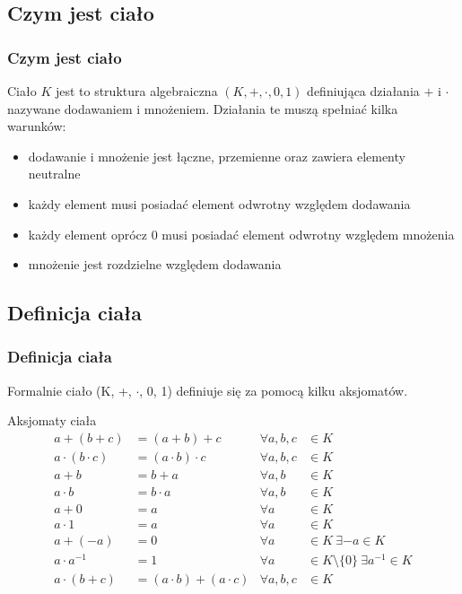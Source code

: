 \documentclass{beamer}
\begin{document}

\subsection{Czym jest ciało}

\begin{frame}
	\frametitle{Czym jest ciało}

	Ciało $K$ jest to struktura algebraiczna $(K, +, \cdot, 0, 1)$ definiująca
	działania $+$ i $\cdot$ nazywane dodawaniem i mnożeniem.
	Działania te muszą spełniać kilka warunków:
	\begin{itemize}
		\item dodawanie i mnożenie jest łączne, przemienne oraz zawiera elementy neutralne
		\item każdy element musi posiadać element odwrotny względem dodawania
		\item każdy element oprócz $0$ musi posiadać element odwrotny względem mnożenia
		\item mnożenie jest rozdzielne względem dodawania
	\end{itemize}

\end{frame}

\subsection{Definicja ciała}

\begin{frame}
	\frametitle{Definicja ciała}

	Formalnie ciało (K, +, $\cdot$, 0, 1) definiuje się za pomocą kilku aksjomatów.
    \begin{exampleblock}{Aksjomaty ciała}
        \begin{align}
            a + (b + c) &= (a + b) + c & \forall a,b,c &\in K \\
            a \cdot (b \cdot c) &= (a \cdot b) \cdot c & \forall a,b,c &\in K \\
            a + b &= b + a & \forall a,b &\in K \\
            a \cdot b &= b \cdot a & \forall a,b &\in K \\
            a + 0 &= a & \forall a &\in K \\
            a \cdot 1 &= a & \forall a &\in K \\
            a + (-a) &= 0 & \forall a &\in K \: \exists {-a} \in K \\
            a \cdot a^{-1} &= 1 & \forall a &\in K \setminus \{ 0 \} \: \exists a^{-1} \in K \\
            a \cdot (b + c) &= (a \cdot b) + (a \cdot c) & \forall a,b,c &\in K
        \end{align}
    \end{exampleblock}
\end{frame}
\end{document}
